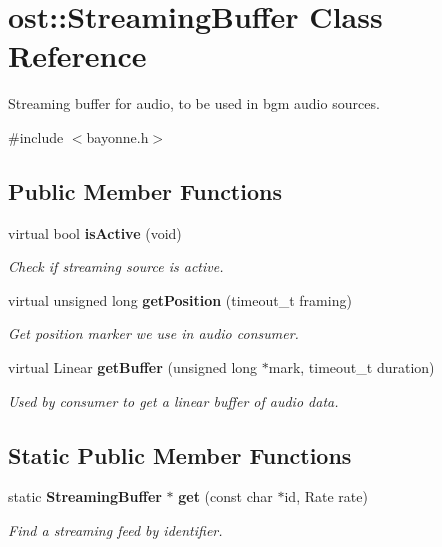 \section{ost::StreamingBuffer Class Reference}
\label{classost_1_1_streaming_buffer}


Streaming buffer for audio, to be used in bgm audio sources.  


{\ttfamily \#include $<$bayonne.h$>$}\subsection*{Public Member Functions}
\begin{DoxyCompactItemize}
\item 
virtual bool {\bf isActive} (void)
\begin{DoxyCompactList}\small\item\em Check if streaming source is active. \item\end{DoxyCompactList}\item 
virtual unsigned long {\bf getPosition} (timeout\_\-t framing)
\begin{DoxyCompactList}\small\item\em Get position marker we use in audio consumer. \item\end{DoxyCompactList}\item 
virtual Linear {\bf getBuffer} (unsigned long $\ast$mark, timeout\_\-t duration)
\begin{DoxyCompactList}\small\item\em Used by consumer to get a linear buffer of audio data. \item\end{DoxyCompactList}\end{DoxyCompactItemize}
\subsection*{Static Public Member Functions}
\begin{DoxyCompactItemize}
\item 
static {\bf StreamingBuffer} $\ast$ {\bf get} (const char $\ast$id, Rate rate)
\begin{DoxyCompactList}\small\item\em Find a streaming feed by identifier. \item\end{DoxyCompactList}\end{DoxyCompactItemize}
